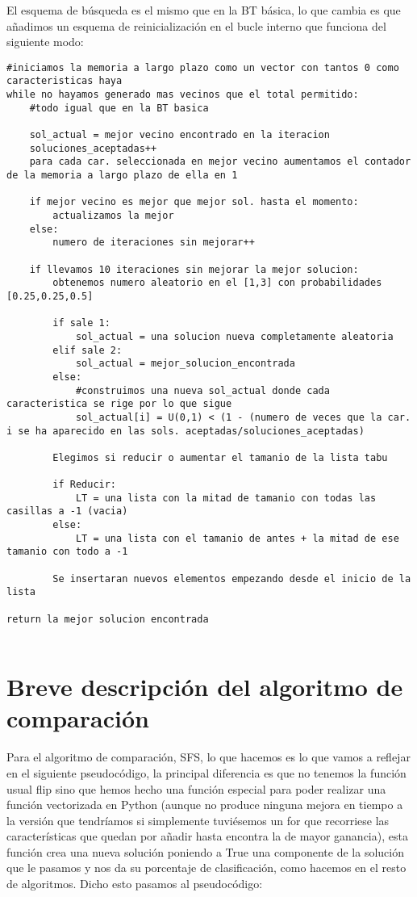 \documentclass[10pt,a4paper]{article}
\begin{document}
El esquema de búsqueda es el mismo que en la BT básica, lo que cambia es que añadimos un esquema de reinicialización en el bucle interno que funciona del siguiente modo:\\

\begin{lstlisting}
#iniciamos la memoria a largo plazo como un vector con tantos 0 como caracteristicas haya
while no hayamos generado mas vecinos que el total permitido:
	#todo igual que en la BT basica
	
	sol_actual = mejor vecino encontrado en la iteracion
	soluciones_aceptadas++
	para cada car. seleccionada en mejor vecino aumentamos el contador de la memoria a largo plazo de ella en 1
	
	if mejor vecino es mejor que mejor sol. hasta el momento:
		actualizamos la mejor
	else:
		numero de iteraciones sin mejorar++
		
	if llevamos 10 iteraciones sin mejorar la mejor solucion:
		obtenemos numero aleatorio en el [1,3] con probabilidades [0.25,0.25,0.5]
		
		if sale 1:
			sol_actual = una solucion nueva completamente aleatoria
		elif sale 2:
			sol_actual = mejor_solucion_encontrada
		else:
			#construimos una nueva sol_actual donde cada caracteristica se rige por lo que sigue
			sol_actual[i] = U(0,1) < (1 - (numero de veces que la car. i se ha aparecido en las sols. aceptadas/soluciones_aceptadas)
			
		Elegimos si reducir o aumentar el tamanio de la lista tabu
		
		if Reducir:
			LT = una lista con la mitad de tamanio con todas las casillas a -1 (vacia)
		else:
			LT = una lista con el tamanio de antes + la mitad de ese tamanio con todo a -1
			
		Se insertaran nuevos elementos empezando desde el inicio de la lista
		
return la mejor solucion encontrada
		
\end{lstlisting}
\newpage
\section{\color[rgb]{0.0,0.0,0.21}Breve descripción del algoritmo de comparación}

Para el algoritmo de comparación, SFS, lo que hacemos es lo que vamos a reflejar en el siguiente pseudocódigo, la principal diferencia es que no tenemos la función usual flip sino que hemos hecho una función especial para poder realizar una función vectorizada en Python (aunque no produce ninguna mejora en tiempo a la versión que tendríamos si simplemente tuviésemos un for que recorriese las características que quedan por añadir hasta encontra la de mayor ganancia), esta función crea una nueva solución poniendo a True una componente de la solución que le pasamos y nos da su porcentaje de clasificación, como hacemos en el resto de algoritmos. Dicho esto pasamos al pseudocódigo:
\end{document}
